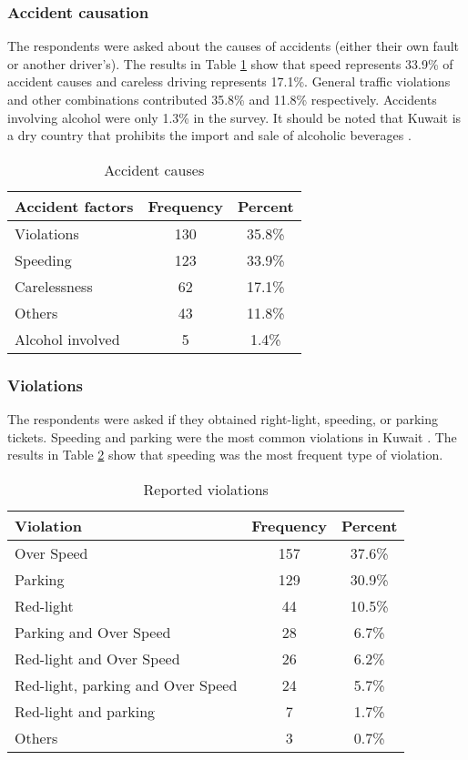 \documentclass[preprint,12pt,a4paper,authoryear]{elsarticle}
\begin{document}
\subsubsection{Accident causation}
The respondents were asked about the causes of accidents (either their own fault or another driver's). The results in Table \ref{tab:causes} show that speed represents 33.9\% of accident causes and careless driving represents 17.1\%. General traffic violations and other combinations contributed 35.8\% and 11.8\% respectively.  Accidents involving alcohol were only 1.3\% in the survey.  It should be noted that Kuwait is a dry country that prohibits the import and sale of alcoholic beverages \citep{FCO2013}. 

\begin{table}[H]
\centering
\caption{Accident causes}
\label{tab:causes}
\begin{tabular}{@{}lcc@{}}
\toprule
\textbf{Accident factors} & \textbf{Frequency} & \textbf{Percent} \\ \midrule
Violations & 130 & 35.8\% \\
Speeding & 123 & 33.9\% \\
Carelessness & 62 & 17.1\% \\
Others & 43 & 11.8\% \\
Alcohol involved & 5 & 1.4\% \\ \bottomrule
\end{tabular}
\end{table}

\subsubsection{Violations}
The respondents were asked if they obtained right-light, speeding, or parking tickets. Speeding and parking were the most common violations in Kuwait \citep{CSB2017}. The results in Table \ref{tab:violations} show that speeding was the most frequent type of violation.

\begin{table}[H]
\centering
\caption{Reported violations}
\label{tab:violations}
\begin{tabular}{@{}lcc@{}}
\toprule
\textbf{Violation} & \textbf{Frequency} & \textbf{Percent} \\ \midrule
Over Speed & 157 & 37.6\% \\
Parking & 129 & 30.9\% \\
Red-light & 44 & 10.5\% \\
Parking and Over Speed & 28 & 6.7\% \\
Red-light and Over Speed & 26 & 6.2\% \\
Red-light, parking and Over Speed & 24 & 5.7\% \\
Red-light and parking & 7 & 1.7\% \\
Others & 3 & 0.7\% \\ \bottomrule
\end{tabular}
\end{table}
\end{document}
